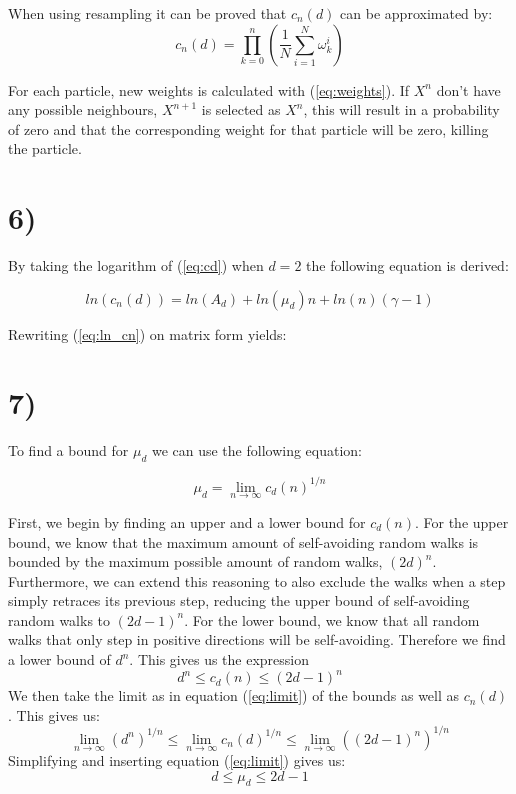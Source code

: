 \documentclass[a4paper]{article}
\begin{document}
When using resampling it can be proved that $c_n(d)$ can be approximated by:
\begin{equation}
    c_n(d) = \prod_{k = 0}^n(\frac{1}{N}\sum_{i=1}^N\omega_k^i)
\end{equation}

For each particle, new weights is calculated with (\ref{eq:weights}). If $X^{n}$ don't have any possible neighbours, $X^{n+1}$ is selected as $X^n$, this will result in a probability of zero and that the corresponding weight for that particle will be zero, killing the particle.

\section*{6)}

By taking the logarithm of (\ref{eq:cd}) when $d=2$ the following equation is derived:

\begin{equation}
    ln(c_n(d)) =  ln(A_d)+ln(\mu_d)n+ln(n)({\gamma-1})
    \label{eq:ln_cn}
\end{equation}

Rewriting (\ref{eq:ln_cn}) on matrix form yields:
\section*{7)}

To find a bound for $\mu_d$ we can use the following equation:

\begin{equation}
    \label{eq:limit}
     \mu_d = \lim_{n \to \infty} c_d(n)^{1/n}
\end{equation}


First, we begin by finding an upper and a lower bound for $c_d(n)$. For the upper bound, we know that the maximum amount of self-avoiding random walks is bounded by the maximum possible amount of random walks, $(2d)^n$. Furthermore, we can extend this reasoning to also exclude the walks when a step simply retraces its previous step, reducing the upper bound of self-avoiding random walks to $(2d-1)^n$. For the lower bound, we know that all random walks that only step in positive directions will be self-avoiding. Therefore we find a lower bound of $d^n$. This gives us the expression \begin{equation}
    d^n \leq c_d(n) \leq (2d-1)^n
\end{equation}
We then take the limit as in equation (\ref{eq:limit}) of the bounds as well as $c_n(d)$. This gives us:
\begin{equation}
    \lim_{n \to \infty} (d^n)^{1/n} \leq \lim_{n \to \infty} c_n(d)^{1/n} \leq \lim_{n \to \infty} ((2d-1)^n)^{1/n}
\end{equation}
Simplifying and inserting equation (\ref{eq:limit}) gives us:
\begin{equation}
    d \leq \mu_d \leq 2d-1
\end{equation}
\end{document}
